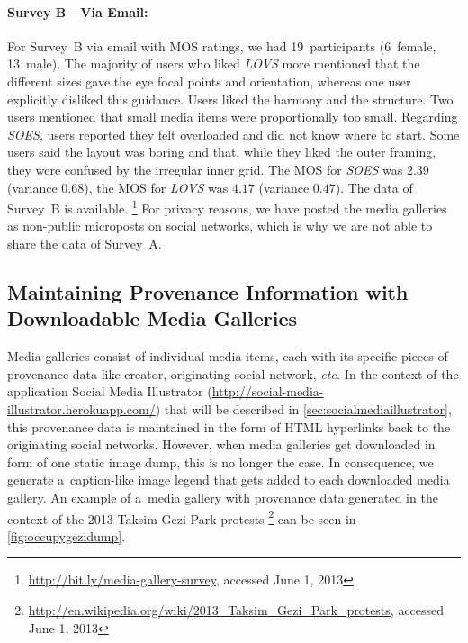 \paragraph{Survey B---Via Email:}

For Survey~B via email with MOS ratings,
we had 19~participants (6~female, 13~male).
The majority of users who liked \emph{LOVS} more
mentioned that the different sizes
gave the eye focal points and orientation,
whereas one user explicitly disliked this guidance.
Users liked the harmony and the structure.
Two users mentioned that small media items were proportionally too small.
Regarding \emph{SOES}, users reported they felt overloaded
and did not know where to start.
Some users said the layout was boring and that,
while they liked the outer framing,
they were confused by the irregular inner grid.
The MOS for \emph{SOES} was $2.39$ (variance $0.68$),
the MOS for \emph{LOVS} was $4.17$ (variance $0.47$).
The data of Survey~B is available.%
\footnote{\url{http://bit.ly/media-gallery-survey},
accessed June 1, 2013}
For privacy reasons, we have posted the media galleries
as non-public microposts on social networks,
which is why we are not able to share the data of Survey~A.

\subsection{Maintaining Provenance Information with Downloadable Media Galleries}

Media galleries consist of individual media items,
each with its specific pieces of provenance data
like creator, originating social network, \emph{etc.}
In the context of the application Social Media Illustrator
(\url{http://social-media-illustrator.herokuapp.com/})
that will be described in \autoref{sec:socialmediaillustrator},
this provenance data is maintained in the form of HTML hyperlinks
back to the originating social networks.
However, when media galleries get downloaded in form of
one static image dump, this is no longer the case.
In consequence, we generate a~caption-like image legend
that gets added to each downloaded media gallery.
An example of a~media gallery with provenance data
generated in the context of the 2013 Taksim Gezi Park protests%
\footnote{\url{http://en.wikipedia.org/wiki/2013_Taksim_Gezi_Park_protests},
accessed June 1, 2013}
can be seen in \autoref{fig:occupygezidump}.

